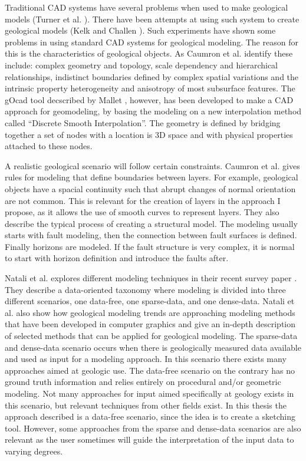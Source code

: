 \documentclass[a4paper,12pt]{report}
\begin{document}
Traditional CAD systems have several problems when used to make geological models (Turner et al. \cite{turner2006challenges}). There have been attempts at using such system to create geological models (Kelk and Challen \cite{kelk1992experiments}). Such experiments have shown some problems in using standard CAD systems for geological modeling. The reason for this is the characteristics of geological objects. As Caumron et al. \cite{caumon2009surface} identify these include: complex geometry and topology, scale dependency and hierarchical relationships, indistinct boundaries defined by complex spatial variations and the intrinsic property heterogeneity and anisotropy of most subsurface features. The gOcad tool decscribed by Mallet \cite{mallet1992gocad}, however, has been developed to make a CAD approach for geomodeling, by basing the modeling on a new interpolation method called ``Discrete Smooth Interpolation''. The geometry is defined by bridging together a set of nodes with a location is 3D space and with 
physical properties attached to these nodes.

A realistic geological scenario will follow certain constraints.  Caumron et al. gives rules for modeling that define boundaries between layers. For example, geological objects have a spacial continuity such that abrupt changes of normal orientation are not common. This is relevant for the creation of layers in the approach I propose, as it allows the use of smooth curves to represent layers. They also describe  the typical process of creating a structural model. The modeling usually starts with fault modeling, then the connection between fault surfaces is defined. Finally horizons are modeled. If the fault structure is very complex, it is normal to start with horizon definition and introduce the faults after.

Natali et al. explores different modeling techniques in their recent survey paper \cite{natali2013modeling}. They describe a data-oriented taxonomy where modeling is divided into three different scenarios, one data-free, one sparse-data, and one dense-data. Natali et al. also show how geological modeling trends are approaching modeling methods that have been developed in computer graphics and give an in-depth description of selected methods that can be applied for geological modeling. The sparse-data and dense-data scenario occurs when there is geologically measured data available and used as input for a modeling approach. In this scenario there exists many approaches aimed at geologic use. The data-free scenario on the contrary has no ground truth information and relies entirely on procedural and/or geometric modeling. Not many approaches for input aimed specifically at geology exists in this scenario, but relevant techniques from other fields exist. In this thesis the approach described is a data-free 
scenario, since the idea is to create a sketching tool. However, some approaches from the sparse and dense-data scenarios are also relevant as the user sometimes will guide the interpretation of the input data to varying degrees. 
\end{document}
